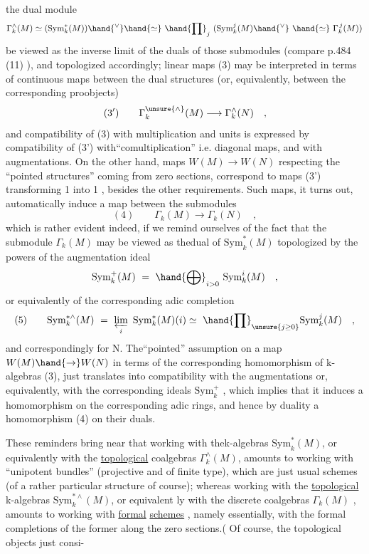 
the dual module
\[\Gamma_k^{\wedge}(M)\simeq(\mathrm{Sym}_k^{*}(M))\hand{^{\vee}}\hand{\simeq}\ \hand{\prod}_j\ (\mathrm{Sym}_k^{j}(M)\hand{^{\vee}}\ \hand{\simeq}\ \Gamma_k^{\,j}(M))\]
 be viewed as the inverse limit of the duals of those submodules
(compare p.484 (11) ), and topologized accordingly; linear maps (3)
may be interpreted in terms of continuous maps between the dual structures
(or, equivalently, between the corresponding proobjects)
\[(3')\qquad \Gamma_k^{\unsure{\wedge}}(M)\longrightarrow\Gamma_k^{\wedge}(N)\quad ,\]
and compatibility of (3) with multiplication and units is expressed by
compatibility of (3') with``comultiplication'' i.e. diagonal maps, and
with augmentations. On the other hand, maps $W(M)\rightarrow W(N)$ respecting the
``pointed structures'' coming from zero sections, correspond to maps (3')
transforming 1 into 1 , besides the other requirements. Such maps,
it turns out, automatically  induce a map between the submodules
\[(4)\qquad \Gamma_k(M)\longrightarrow\Gamma_k(N)\quad ,\]
which is rather evident indeed, if we  remind ourselves of 
the fact that the submodule $\Gamma_k(M)$ may be viewed as thedual of $\mathrm{Sym}_k^{*}(M)$\hand{,}
topologized by the powers of the augmentation ideal 
\[\mathrm{Sym}_k^{+}(M)\ =\ \hand{\bigoplus}_{i>0}\ \mathrm{Sym}_k^{i}(M)\quad ,\]
or equivalently of the corresponding adic completion
\[(5)\qquad \mathrm{Sym}_k^{*\wedge}(M)\ =\ \varprojlim_{i}\ \mathrm{Sym}_k^{*}(M)(i)\simeq\ \hand{\prod}_{\unsure{j\geq 0}}\mathrm{Sym}_k^{j}(M)\quad ,\]
and correspondingly for N. The``pointed'' assumption on  a map $W(M)\hand{\rightarrow}W(N)$\hand{,}
in terms of the corresponding homomorphism of k-algebras (3), just
translates into compatibility with the augmentations or, equivalently,
with the corresponding ideals $\mathrm{Sym}_k^{+}$ , which implies that it induces a
homomorphism on the corresponding adic rings, and hence by duality a
homomorphism (4) on their duals.

These reminders bring near that working with thek-algebras
$\mathrm{Sym}_k^{*}(M)$, or equivalently with the \uline{topological} coalgebras $\Gamma_k^{\wedge}(M)$, amounts
to working with ``unipotent bundles'' (projective and of finite type),
which are just usual schemes (of a rather particular structure of course);
whereas working with the \uline{topological} k-algebras $\mathrm{Sym}_k^{*\wedge}(M)$, or equivalent
\hand{-}ly with the discrete coalgebras $\Gamma_k(M)$ , amounts to working with \uline{formal}
\uline{schemes} , namely essentially, with the formal completions of the former
along the zero sections.( Of course, the topological objects just consi-

